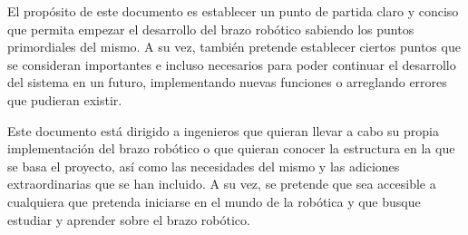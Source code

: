 El propósito de este documento es establecer un punto de partida claro y conciso que permita empezar el desarrollo del brazo robótico sabiendo los puntos primordiales del mismo. A su vez, también pretende establecer ciertos puntos que se consideran importantes e incluso necesarios para poder continuar el desarrollo del sistema en un futuro, implementando nuevas funciones o arreglando errores que pudieran existir.

Este documento está dirigido a ingenieros que quieran llevar a cabo su propia implementación del brazo robótico o que quieran conocer la estructura en la que se basa el proyecto, así como las necesidades del mismo y las adiciones extraordinarias que se han incluido. A su vez, se pretende que sea accesible a cualquiera que pretenda iniciarse en el mundo de la robótica y que busque estudiar y aprender sobre el brazo robótico.